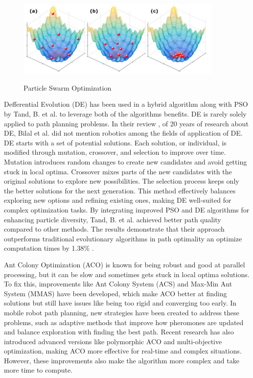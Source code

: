 \begin{figure}[H]
    \begin{center}
        \includegraphics[width=4in]{images/Chap1/PSO.png}\\
        \caption{Particle Swarm Optimization \cite{R42}}
        \label{pso}
    \end{center}
\end{figure}

Defferential Evolution (DE) has been used in a hybrid algorithm along with PSO by Tand, B. et al. \cite{R43} to leverage 
both of the algorithms benefits. DE is rarely solely applied to path planning problems. In their review \cite{R37}
, of 20 years of research about DE, Bilal et al. did not mention robotics among the fields of application of DE. 
DE starts with a set of potential solutions. Each solution, or individual, is modified 
through mutation, crossover, and selection to improve over time. Mutation introduces random changes to create new 
candidates and avoid getting stuck in local optima. Crossover mixes parts of the new candidates with the original 
solutions to explore new possibilities. The selection process keeps only the better solutions for the next generation. 
This method effectively balances exploring new options and refining existing ones, making DE well-suited for complex 
optimization tasks.
By integrating improved PSO and DE algorithms for enhancing particle diversity, Tand, B. et al. achieved better 
path quality compared to other methods. The results demonstrate that their approach outperforms traditional 
evolutionary algorithms in path optimality an optimize computation times by 1.38\% \cite{R43}. 

Ant Colony Optimization (ACO) is known for being robust and good at parallel processing, but it can be slow and 
sometimes gets stuck in local optima solutions. To fix this, improvements like Ant Colony System (ACS) 
and Max-Min Ant System (MMAS) have been developed, which make ACO better at finding solutions but still have 
issues like being too rigid and converging too early. In mobile robot path planning, new strategies have been 
created to address these problems, such as adaptive methods that improve how pheromones are updated and balance 
exploration with finding the best path. Recent research has also introduced advanced versions like polymorphic 
ACO and multi-objective optimization, making ACO more effective for real-time and complex situations. However, 
these improvements also make the algorithm more complex and take more time to compute.

